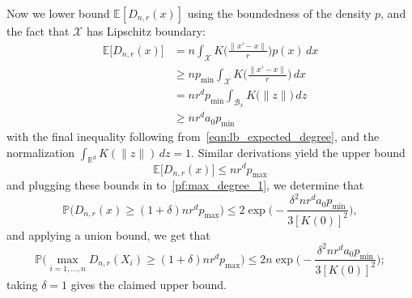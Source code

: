 \documentclass[twoside]{article}
\newcommand{\Reals}{\mathbb{R}}
\newcommand{\1}{\mathbf{1}}
\newcommand{\Rd}{\Reals^d}
\newcommand{\Xset}{\mathcal{X}}
\newcommand{\mc}[1]{\mathcal{#1}}
\newcommand{\Pbb}{\mathbb{P}}
\newcommand{\Ebb}{\mathbb{E}}
\theoremstyle{definition}
\theoremstyle{remark}
\begin{document}
Now we lower bound $\Ebb[D_{n,r}(x)]$ using the boundedness of the density $p$, and the fact that $\Xset$ has Lipschitz boundary:
\begin{align*}
\Ebb\bigl[D_{n,r}(x)\bigr] & = n \int_{\Xset} K\biggl(\frac{\|x' - x\|}{r}\biggr) p(x) \,dx \\
& \geq n p_{\min} \int_{\Xset} K\biggl(\frac{\|x' - x\|}{r}\biggr) \,dx \\
& =  nr^d p_{\min}\int_{\mc{B}_x} K\bigl(\|z\|\bigr) \,dz \\
& \geq nr^d a_0 p_{\min}
\end{align*}
with the final inequality following from~\eqref{eqn:lb_expected_degree}, and the normalization $\int_{\Rd} K(\|z\|) \,dz = 1$. Similar derivations yield the upper bound
\begin{equation*}
\Ebb\bigl[D_{n,r}(x)\bigr] \leq nr^{d} p_{\max}
\end{equation*} 
and plugging these bounds in to~\eqref{pf:max_degree_1}, we determine that
\begin{equation*}
\Pbb\biggl(D_{n,r}(x) \geq (1 + \delta) nr^d p_{\max}\biggr) \leq 2\exp\biggl(-\frac{\delta^2nr^da_0p_{\min}}{3[K(0)]^2}\biggr),
\end{equation*}
and applying a union bound, we get that
\begin{equation*}
\Pbb\biggl(\max_{i = 1,\ldots,n}D_{n,r}(X_i) \geq (1 + \delta) nr^d p_{\max}\biggr) \leq 2n\exp\biggl(-\frac{\delta^2nr^da_0p_{\min}}{3[K(0)]^2}\biggr);
\end{equation*}
taking $\delta = 1$ gives the claimed upper bound.

\clearpage


 
\end{document}
